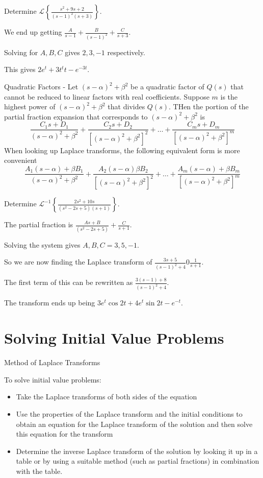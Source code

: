 \documentclass[../diffeq.tex]{subfiles}
\begin{document}
\pagebreak
\begin{example}
    Determine $\mathcal{L}\left\{\frac{s^2+9s+2}{(s-1)^2(s+3)}\right\}$.

    We end up getting $\frac{A}{s-1}+\frac{B}{(s-1)^2}+\frac{C}{s+3}$.

    Solving for $A,B,C$ gives $2,3,-1$ respectively.

    This gives $2e^t+3t^t t - e^{-3t}$.
\end{example}

Quadratic Factors - Let $(s-\alpha)^2+\beta^2$ be a quadratic factor of $Q(s)$ that cannot be reduced to linear factors with real coefficients. Suppose $m$ is the highest power of 
$(s-\alpha)^2+\beta^2$ that divides $Q(s)$. THen the portion of the partial fraction expansion that corresponds to $(s-\alpha)^2+\beta^2$ is 
\[ \frac{C_1 s+D_1}{(s-\alpha)^2+\beta^2}+\frac{C_2s+D_2}{[(s-\alpha)^2+\beta^2]^2}+\dots + \frac{C_ms+D_m}{[(s-\alpha)^2+\beta^2]^m} \]
When looking up Laplace transforms, the following equivalent form is more convenient 
\[ \frac{A_1(s-\alpha)+\beta B_1}{(s-\alpha)^2+\beta^2}+\frac{A_2(s-\alpha)\beta B_2}{[(s-\alpha)^2+\beta^2]^2}+\dots + \frac{A_m(s-\alpha)+\beta B_m}{[(s-\alpha)^2+\beta^2]^m} \]

\begin{example}
    Determine $\mathcal{L}^{-1}\left\{\frac{2s^2+10s}{(s^2-2s+5)(s+1)}\right\}$.

    The partial fraction is $\frac{As+B}{(s^2-2s+5)}+\frac{C}{s+1}$.

    Solving the system gives $A,B,C=3,5,-1$.

    So we are now finding the Laplace transform of $\frac{3s+5}{(s-1)^2+4}0\frac{1}{s+1}$.

    The first term of this can be rewritten as $\frac{3(s-1)+8}{(s-1)^2+4}$.

    The transform ends up being $3e^t\cos 2t + 4e^t \sin 2t - e^{-t}$.
\end{example}

\section{Solving Initial Value Problems}
Method of Laplace Transforms 

To solve initial value problems:
\begin{itemize}
    \item Take the Laplace transforms of both sides of the equation 
    \item Use the properties of the Laplace transform and the initial conditions to obtain an equation for the Laplace transform of the solution and then solve this equation for the transform 
    \item Determine the inverse Laplace transform of the solution by looking it up in a table or by using a suitable method (such as partial fractions) in combination with the table.
\end{itemize}
\end{document}
